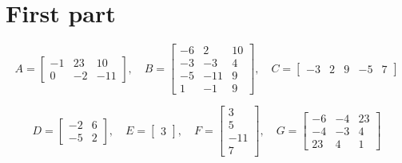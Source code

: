 \documentclass{article}
\begin{document}
\section*{First part}
\[
A =
\begin{bmatrix}
-1 & 23 & 10 \\
0 & -2 & -11
\end{bmatrix},
\quad
B =
\begin{bmatrix}
-6 & 2 & 10 \\
-3 & -3 & 4 \\
-5 & -11 & 9 \\
1 & -1 & 9
\end{bmatrix},
\quad
C =
\begin{bmatrix}
-3 & 2 & 9 & -5 & 7
\end{bmatrix}
\]

\[
D =
\begin{bmatrix}
-2 & 6 \\
-5 & 2
\end{bmatrix},
\quad
E =
\begin{bmatrix}
3
\end{bmatrix},
\quad
F =
\begin{bmatrix}
3 \\
5 \\
-11 \\
7
\end{bmatrix},
\quad
G =
\begin{bmatrix}
-6 & -4 & 23 \\
-4 & -3 & 4 \\
23 & 4 & 1
\end{bmatrix}
\]
\end{document}
